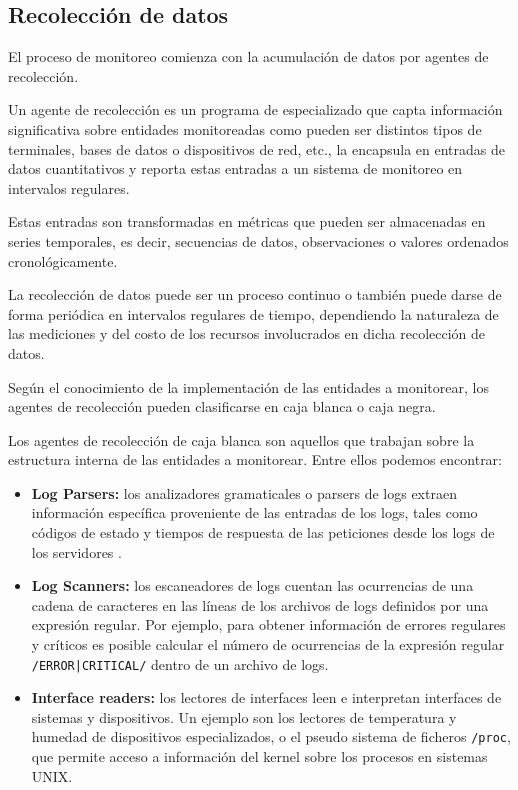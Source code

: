 \subsection{Recolección de datos}
\label{recoleccion-de-datos}

El proceso de monitoreo comienza con la acumulación de datos por agentes de
recolección.

Un agente de recolección es un programa de  especializado que capta
información significativa sobre entidades monitoreadas como pueden ser
distintos tipos de terminales, bases de datos o dispositivos de red, etc., la
encapsula en entradas de datos cuantitativos y reporta estas entradas a un
sistema de monitoreo en intervalos regulares.

Estas entradas son transformadas en métricas que pueden ser almacenadas en
series temporales, es decir, secuencias de datos, observaciones o valores
ordenados cronológicamente.

La recolección de datos puede ser un proceso continuo o también puede darse de
forma periódica en intervalos regulares de tiempo, dependiendo la naturaleza de
las mediciones y del costo de los recursos involucrados en dicha recolección de
datos.

Según el conocimiento de la implementación de las entidades a monitorear, los
agentes de recolección pueden clasificarse en caja blanca o caja negra.

Los agentes de recolección de caja blanca son aquellos que trabajan sobre la
estructura interna de las entidades a monitorear. Entre ellos podemos
encontrar:

\begin{itemize}
  \item \textbf{Log Parsers:} los analizadores gramaticales o parsers de logs
    extraen información específica proveniente de las entradas de los logs,
    tales como códigos de estado y tiempos de respuesta de las peticiones desde
    los logs de los servidores .

  \item \textbf{Log Scanners:} los escaneadores de logs cuentan las ocurrencias
    de una cadena de caracteres en las líneas de los archivos de logs definidos
    por una expresión regular. Por ejemplo, para obtener información de errores
    regulares y críticos es posible calcular el número de ocurrencias de la
    expresión regular \texttt{/ERROR|CRITICAL/} dentro de un archivo de logs.

  \item \textbf{Interface readers:} los lectores de interfaces leen e
    interpretan interfaces de sistemas y dispositivos. Un ejemplo son los
    lectores de temperatura y humedad de dispositivos especializados, o el
    pseudo sistema de ficheros \texttt{/proc}, que permite acceso a información del
    kernel sobre los procesos en sistemas UNIX.
\end{itemize}

